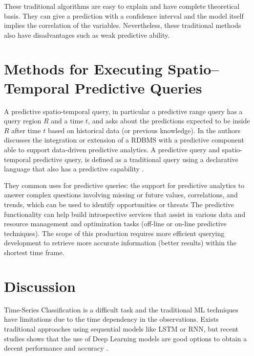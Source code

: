 These traditional algorithms are easy to explain and have complete theoretical basis. They can give a prediction with a confidence interval and the model itself implies the correlation of the variables. Nevertheless, these traditional methods also have disadvantages such as weak predictive ability.

\section{Methods for Executing Spatio--Temporal Predictive Queries}
\label{Sec:RelatedWorksQueries}

A predictive spatio-temporal query, in particular a predictive range query has a query region $R$ and a time $t$, and asks about the predictions expected to be inside $R$ after time $t$ based on historical data (or previous knowledge).  In \cite{Akdere2011} the authors discusses the integration or extension of a RDBMS with a predictive component able to support data-driven predictive analytics. A predictive query and spatio-temporal predictive query, is defined as a traditional query using a declarative language that also has a predictive capability \cite{Hendawi2012}. 

They common uses for predictive queries: the support for predictive analytics to answer complex questions involving missing or future values, correlations, and trends, which  can be used to identify opportunities or threats
The predictive functionality can help build introspective services that assist in various data and resource management and optimization tasks (off-line or on-line predictive techniques). 
The  scope  of  this  production requires  more  efficient  querying development to  retrieve more accurate  information (better results)  within  the  shortest time  frame.

\section{Discussion}
Time-Series Classification is a difficult task and the traditional ML techniques have limitations due to the time dependency in the observations. Exists traditional approaches using sequential models like LSTM or RNN, but recent studies shows that the use of Deep Learning models are good options to obtain a decent performance and accuracy \cite{Fawaz2019}. 
